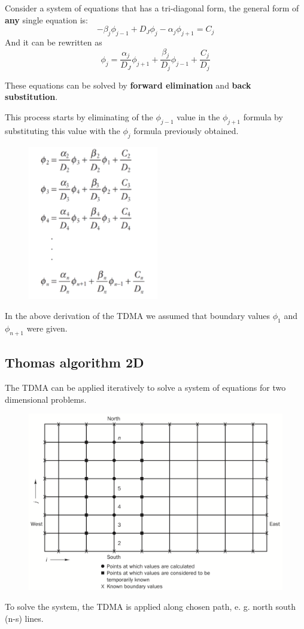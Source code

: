 \documentclass[a4paper, 15pt]{article}
\begin{document}
Consider a system of equations that has a tri-diagonal form, the general form of \textbf{any}
single equation is:
\[-\beta_j\phi_{j-1} + D_J\phi_j-\alpha_j\phi_{j+1} = C_j\]
And it can be rewritten as 
\[\phi_j = \dfrac{\alpha_j}{D_J}\phi_{j+1}  + \dfrac{\beta_j}{D_j}\phi_{j-1} + \dfrac{C_j}{D_j} \]

These
equations can be solved by \textbf{forward elimination} and \textbf{back substitution}. \newpage 

This process starts by eliminating of the $\phi_{j-1}$ value in the $\phi_{j+1}$ formula by substituting this value with the $\phi_j$ formula previously obtained. 
\begin{figure}[H]
	\centering
	\includegraphics[width=0.3\linewidth]{fig/screenshot022}
	\label{fig:screenshot022}
\end{figure}

In the above derivation of the TDMA we assumed that boundary values $\phi_1$ and $\phi_{n+1}$ were given.

\subsection*{Thomas algorithm 2D}

The
TDMA can be applied iteratively to solve a system of equations for two dimensional
problems.
\begin{figure}[H]
	\centering
	\includegraphics[width=0.5\linewidth]{fig/screenshot023}
	\label{fig:screenshot023}
\end{figure}

To
solve the system, the TDMA is applied along chosen path, e. g. north south (n-s) lines. 
\end{document}
